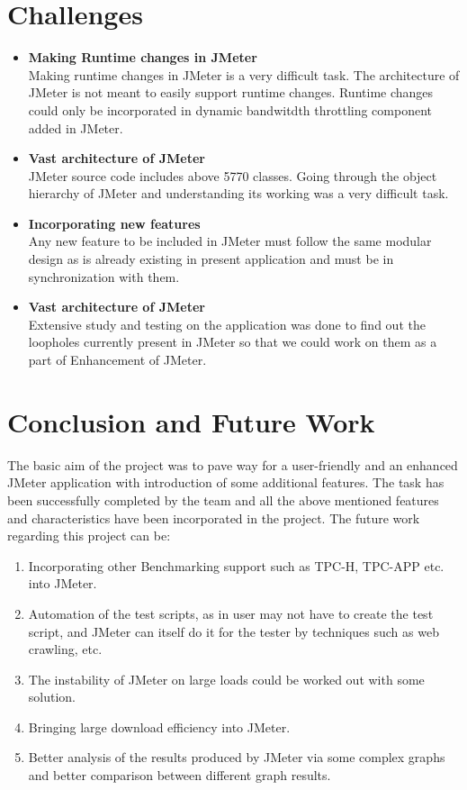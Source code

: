 \documentclass[12pt]{book}
\begin{document}
\chapter{Challenges}

 \begin{itemize}
 \item \textbf{ Making Runtime changes in JMeter}
\\Making runtime changes in JMeter is a very difficult task. The architecture of JMeter is
  not meant to easily support runtime changes. Runtime changes could only be
  incorporated in dynamic bandwitdth throttling component added in JMeter.
  
 \item\textbf{ Vast architecture of JMeter}
  \\
  JMeter source code includes above 5770 classes. Going through the object hierarchy of
  JMeter and understanding its working was a very difficult task.
  
 \item \textbf{ Incorporating new features}
  \\
  Any new feature to be included in JMeter must follow the same modular design as is
  already existing in present application and must be in synchronization with them.
  
 \item \textbf{ Vast architecture of JMeter}
  \\
  Extensive study and testing on the application was done to find out the loopholes
  currently present in JMeter so that we could work on them as a part of Enhancement of
  JMeter.
 \end{itemize} 
 
\chapter{Conclusion and Future Work}
The basic aim of the project was to pave way for a user-friendly and an enhanced JMeter
application with introduction of some additional features. The task has been successfully
completed by the team and all the above mentioned features and characteristics have been
incorporated in the project. The future work regarding this project can be:

\begin{enumerate}
 \item Incorporating other Benchmarking support such as TPC-H, TPC-APP etc. into JMeter.
 \item Automation of the test scripts, as in user may not have to create the test script, and JMeter can itself do it for the 
 tester by techniques such as web crawling, etc.
 \item The instability of JMeter on large loads could be worked out with some solution.
 \item Bringing large download efficiency into JMeter.
 \item Better analysis of the results produced by JMeter via some complex graphs and better
  comparison between different graph results.
\end{enumerate}


  


\end{document}
